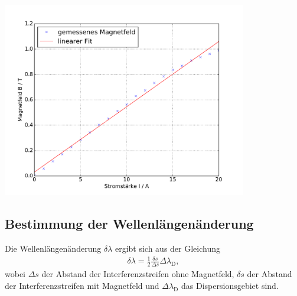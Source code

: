 \documentclass[captions=tableheading]{scrartcl}
\begin{document}
\begin{center}
	\includegraphics[width=0.8\textwidth]{images/magnetfeld.pdf}
	\label{fig:magnetfeld}
\end{center}

\subsection{Bestimmung der Wellenlängenänderung}
Die Wellenlängenänderung $\delta\lambda$ ergibt sich aus der Gleichung
\begin{align}
\delta\lambda=\frac{1}{2}\frac{\delta s}{\Delta s}\Delta\lambda_{\text{D}},
\end{align}
wobei $\Delta s$ der Abstand der Interferenzstreifen ohne Magnetfeld, $\delta s$ der Abstand der Interferenzstreifen mit Magnetfeld und $\Delta\lambda_{\text{D}}$ das Dispersionsgebiet sind.
\end{document}
